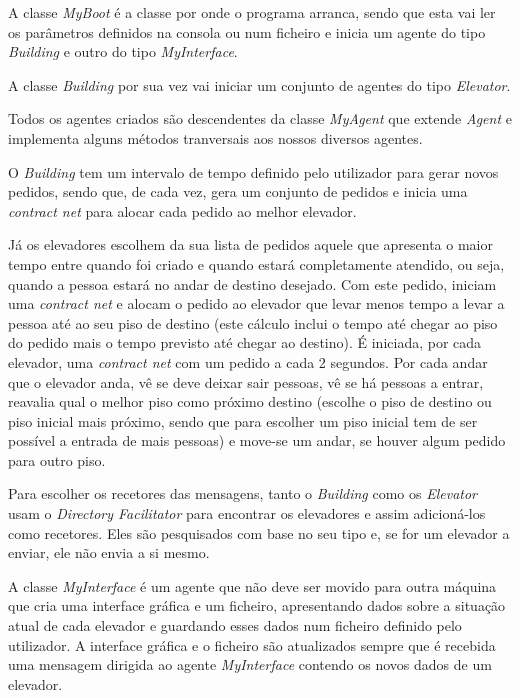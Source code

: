 \documentclass[a4paper]{article}
\begin{document}
A classe \textit{MyBoot} é a classe por onde o programa arranca, sendo que esta vai ler os parâmetros definidos na consola ou num ficheiro e inicia um agente do tipo \textit{Building} e outro do tipo \textit{MyInterface}.

A classe \textit{Building} por sua vez vai iniciar um conjunto de agentes do tipo \textit{Elevator}.

Todos os agentes criados são descendentes da classe \textit{MyAgent} que extende \textit{Agent} e implementa alguns métodos tranversais aos nossos diversos agentes.

O \textit{Building} tem um intervalo de tempo definido pelo utilizador para gerar novos pedidos, sendo que, de cada vez, gera um conjunto de pedidos e inicia uma \textit{contract net} para alocar cada pedido ao melhor elevador.

Já os elevadores escolhem da sua lista de pedidos aquele que apresenta o maior tempo entre quando foi criado e quando estará completamente atendido, ou seja, quando a pessoa estará no andar de destino desejado. Com este pedido, iniciam uma \textit{contract net} e alocam o pedido ao elevador que levar menos tempo a levar a pessoa até ao seu piso de destino (este cálculo inclui o tempo até chegar ao piso do pedido mais o tempo previsto até chegar ao destino). É iniciada, por cada elevador, uma \textit{contract net} com um pedido a cada 2 segundos. Por cada andar que o elevador anda, vê se deve deixar sair pessoas, vê se há pessoas a entrar, reavalia qual o melhor piso como próximo destino (escolhe o piso de destino ou piso inicial mais próximo, sendo que para escolher um piso inicial tem de ser possível a entrada de mais pessoas) e move-se um andar, se houver algum pedido para outro piso.

Para escolher os recetores das mensagens, tanto o \textit{Building} como os \textit{Elevator} usam o \textit{Directory Facilitator} para encontrar os elevadores e assim adicioná-los como recetores. Eles são pesquisados com base no seu tipo e, se for um elevador a enviar, ele não envia a si mesmo.

A classe \textit{MyInterface} é um agente que não deve ser movido para outra máquina que cria uma interface gráfica e um ficheiro, apresentando dados sobre a situação atual de cada elevador e guardando esses dados num ficheiro definido pelo utilizador. A interface gráfica e o ficheiro são atualizados sempre que é recebida uma mensagem dirigida ao agente \textit{MyInterface} contendo os novos dados de um elevador.
\end{document}
